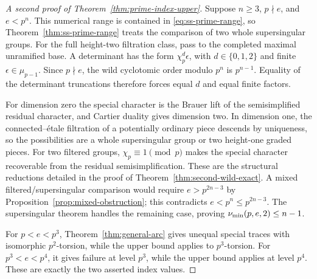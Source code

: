 \begin{proof}[A second proof of Theorem~\ref{thm:prime-index-upper}]
Suppose $n\ge3$, $p\nmid e$, and $e<p^n$. This numerical range is contained in \eqref{eq:ss-prime-range}, so Theorem~\ref{thm:ss-prime-range} treats the comparison of two whole supersingular groups. For the full height-two filtration class, pass to the completed maximal unramified base. A determinant has the form $\chi_p^d\epsilon$, with $d\in\{0,1,2\}$ and finite $\epsilon\in\mu_{p-1}$. Since $p\nmid e$, the wild cyclotomic order modulo $p^n$ is $p^{n-1}$. Equality of the determinant truncations therefore forces equal $d$ and equal finite factors.

For dimension zero the special character is the Brauer lift of the semisimplified residual character, and Cartier duality gives dimension two. In dimension one, the connected--\'etale filtration of a potentially ordinary piece descends by uniqueness, so the possibilities are a whole supersingular group or two height-one graded pieces. For two filtered groups, $\chi_p\equiv1\pmod p$ makes the special character recoverable from the residual semisimplification. These are the structural reductions detailed in the proof of Theorem~\ref{thm:second-wild-exact}. A mixed filtered/supersingular comparison would require $e>p^{2n-3}$ by Proposition~\ref{prop:mixed-obstruction}; this contradicts $e<p^n\le p^{2n-3}$. The supersingular theorem handles the remaining case, proving $\nu_{\min}(p,e,2)\le n-1$.

For $p<e<p^3$, Theorem~\ref{thm:general-arc} gives unequal special traces with isomorphic $p^2$-torsion, while the upper bound applies to $p^3$-torsion. For $p^3<e<p^4$, it gives failure at level $p^3$, while the upper bound applies at level $p^4$. These are exactly the two asserted index values.
\end{proof}

